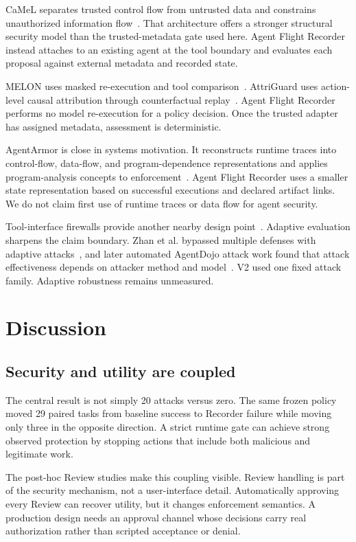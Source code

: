 \documentclass[letterpaper,twocolumn,10pt]{article}
\begin{document}
CaMeL separates trusted control flow from untrusted data and constrains unauthorized information flow~\cite{debenedetti2025camel}. That architecture offers a stronger structural security model than the trusted-metadata gate used here. Agent Flight Recorder instead attaches to an existing agent at the tool boundary and evaluates each proposal against external metadata and recorded state.

MELON uses masked re-execution and tool comparison~\cite{zhu2025melon}. AttriGuard uses action-level causal attribution through counterfactual replay~\cite{he2026attriguard}. Agent Flight Recorder performs no model re-execution for a policy decision. Once the trusted adapter has assigned metadata, assessment is deterministic.

AgentArmor is close in systems motivation. It reconstructs runtime traces into control-flow, data-flow, and program-dependence representations and applies program-analysis concepts to enforcement~\cite{wang2025agentarmor}. Agent Flight Recorder uses a smaller state representation based on successful executions and declared artifact links. We do not claim first use of runtime traces or data flow for agent security.

Tool-interface firewalls provide another nearby design point~\cite{bhagwatkar2025firewalls}. Adaptive evaluation sharpens the claim boundary. Zhan et al. bypassed multiple defenses with adaptive attacks~\cite{zhan2025adaptive}, and later automated AgentDojo attack work found that attack effectiveness depends on attacker method and model~\cite{hofer2026automated}. V2 used one fixed attack family. Adaptive robustness remains unmeasured.

\section{Discussion}
\subsection{Security and utility are coupled}
The central result is not simply 20 attacks versus zero. The same frozen policy moved 29 paired tasks from baseline success to Recorder failure while moving only three in the opposite direction. A strict runtime gate can achieve strong observed protection by stopping actions that include both malicious and legitimate work.

The post-hoc Review studies make this coupling visible. Review handling is part of the security mechanism, not a user-interface detail. Automatically approving every Review can recover utility, but it changes enforcement semantics. A production design needs an approval channel whose decisions carry real authorization rather than scripted acceptance or denial.
\end{document}
